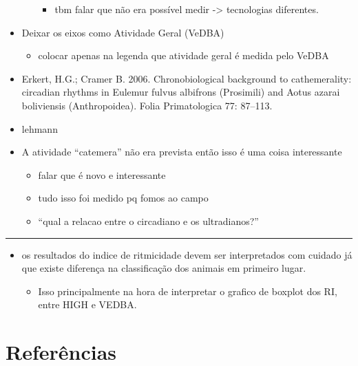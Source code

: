 \documentclass[msc,numbers,hidelinks]{coppe}
\providecommand{\tightlist}{
  \setlength{\itemsep}{0pt}\setlength{\parskip}{0pt}}
\begin{document}
\begin{itemize}
\begin{itemize}
\begin{itemize}
      \item
        tbm falar que não era possível medir -\textgreater{} tecnologias diferentes.
      \end{itemize}
    \end{itemize}
  \item
    Deixar os eixos como Atividade Geral (VeDBA)
    \begin{itemize}
    \tightlist
    \item
      colocar apenas na legenda que atividade geral é medida pelo VeDBA
    \end{itemize}
  \item
    Erkert, H.G.; Cramer B. 2006. Chronobiological background to cathemerality: circadian rhythms in Eulemur fulvus albifrons (Prosimili) and Aotus azarai boliviensis (Anthropoidea). Folia Primatologica 77: 87--113.
  \item
    lehmann
  \item
    A atividade ``catemera'' não era prevista então isso é uma coisa interessante
    \begin{itemize}
    \tightlist
    \item
      falar que é novo e interessante
    \item
      tudo isso foi medido pq fomos ao campo
    \item
      ``qual a relacao entre o circadiano e os ultradianos?''
    \end{itemize}
  \end{itemize}
  \begin{center}\rule{0.5\linewidth}{0.5pt}\end{center}
  \begin{itemize}
  \item
    os resultados do indice de ritmicidade devem ser interpretados com cuidado já que existe diferença na classificação dos animais em primeiro lugar.
    \begin{itemize}
    \tightlist
    \item
      Isso principalmente na hora de interpretar o grafico de boxplot dos RI, entre HIGH e VEDBA.
    \end{itemize}
  \end{itemize}
  \backmatter
  

  \hypertarget{referuxeancias}{%
  \chapter*{Referências}\label{referuxeancias}}
\end{document}
